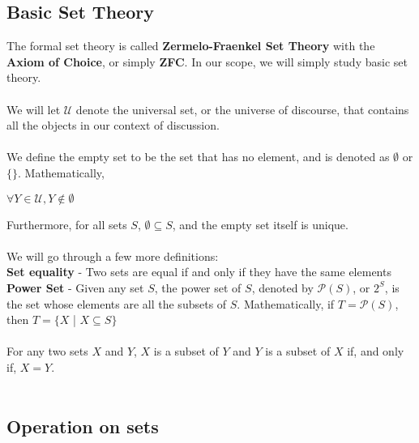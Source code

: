 \documentclass[a4paper]{article}
\begin{document}
\subsection{Basic Set Theory}
The formal set theory is called \textbf{Zermelo-Fraenkel Set Theory} with the \textbf{Axiom of Choice}, or simply \textbf{ZFC}. In our scope, we will simply study basic set theory.\\ \\
We will let $\mathcal{U}$ denote the universal set, or the universe of discourse, that contains all the objects in our context of discussion.\\ \\
We define the empty set to be the set that has no element, and is denoted as $\emptyset$ or $\{\}$. Mathematically,
\begin{center}
	$\forall Y \in \mathcal{U}, Y \notin \emptyset$
\end{center}
Furthermore, for all sets $S$, $\emptyset \subseteq S$, and the empty set itself is unique.\\ \\
We will go through a few more definitions:\\
\textbf{Set equality} - Two sets are equal if and only if they have the same elements\\
\textbf{Power Set} - Given any set $S$, the power set of $S$, denoted by $\mathcal{P}(S)$, or $2^S$, is the set whose elements are all the subsets of $S$. Mathematically, if $T = \mathcal{P}(S)$, then $T=\{X$ | $X \subseteq S \}$\\ \\
For any two sets $X$ and $Y$, $X$ is a subset of $Y$ and $Y$ is a subset of $X$ if, and only if, $X=Y$.\\ \\

\subsection{Operation on sets}
\end{document}
